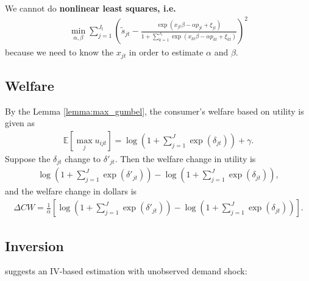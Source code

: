 \documentclass[11pt]{elegantbook}
\begin{document}
\begin{note}
    We cannot do \textbf{nonlinear least squares, i.e.}
    \begin{equation}
        \begin{aligned}
            \min_{\alpha,\beta} \sum_{j=1}^{J_t}\left(\tilde{s}_{jt}-\frac{\exp(x_{jt}\beta-\alpha p_{jt}+\xi_{jt})}{1+\sum_{k=1}^{J_t}\exp(x_{kt}\beta-\alpha p_{kt}+\xi_{kt})}\right)^2
        \end{aligned}
        \nonumber
    \end{equation}
    because we need to know the $x_{jt}$ in order to estimate $\alpha$ and $\beta$.
\end{note}

\subsection{Welfare}
By the Lemma \ref{lemma:max_gumbel}, the consumer's welfare based on utility is given as
\begin{equation}
    \begin{aligned}
        \mathbb{E}[\max_{j} u_{ijt}]=\log\left(1+\sum_{j=1}^{J}\exp(\delta_{jt})\right)+\gamma.
    \end{aligned}
    \nonumber
\end{equation}
Suppose the $\delta_{jt}$ change to $\delta'_{jt}$. Then the welfare change in utility is
\begin{equation}
    \begin{aligned}
        \log\left(1+\sum_{j=1}^{J}\exp(\delta'_{jt})\right)-\log\left(1+\sum_{j=1}^{J}\exp(\delta_{jt})\right),
    \end{aligned}
    \nonumber
\end{equation}
and the welfare change in dollars is
\begin{equation}
    \begin{aligned}
        \Delta CW=\frac{1}{\alpha}\left[\log\left(1+\sum_{j=1}^{J}\exp(\delta'_{jt})\right)-\log\left(1+\sum_{j=1}^{J}\exp(\delta_{jt})\right)\right].
    \end{aligned}
    \nonumber
\end{equation}






\subsection{Inversion}
\cite{berry1994estimating} suggests an IV-based estimation with unobserved demand shock:
\end{document}
